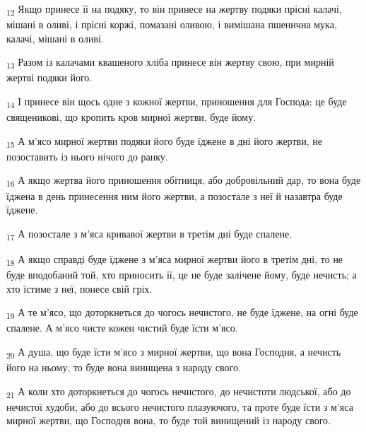 \begin{tcolorbox}
\textsubscript{12} Якщо принесе її на подяку, то він принесе на жертву подяки прісні калачі, мішані в оливі, і прісні коржі, помазані оливою, і вимішана пшенична мука, калачі, мішані в оливі.
\end{tcolorbox}
\begin{tcolorbox}
\textsubscript{13} Разом із калачами квашеного хліба принесе він жертву свою, при мирній жертві подяки його.
\end{tcolorbox}
\begin{tcolorbox}
\textsubscript{14} І принесе він щось одне з кожної жертви, приношення для Господа; це буде священикові, що кропить кров мирної жертви, буде йому.
\end{tcolorbox}
\begin{tcolorbox}
\textsubscript{15} А м'ясо мирної жертви подяки його буде їджене в дні його жертви, не позоставить із нього нічого до ранку.
\end{tcolorbox}
\begin{tcolorbox}
\textsubscript{16} А якщо жертва його приношення обітниця, або добровільний дар, то вона буде їджена в день принесення ним його жертви, а позостале з неї й назавтра буде їджене.
\end{tcolorbox}
\begin{tcolorbox}
\textsubscript{17} А позостале з м'яса кривавої жертви в третім дні буде спалене.
\end{tcolorbox}
\begin{tcolorbox}
\textsubscript{18} А якщо справді буде їджене з м'яса мирної жертви його в третім дні, то не буде вподобаний той, хто приносить її, це не буде залічене йому, буде нечисть; а хто їстиме з неї, понесе свій гріх.
\end{tcolorbox}
\begin{tcolorbox}
\textsubscript{19} А те м'ясо, що доторкнеться до чогось нечистого, не буде їджене, на огні буде спалене. А м'ясо чисте кожен чистий буде їсти м'ясо.
\end{tcolorbox}
\begin{tcolorbox}
\textsubscript{20} А душа, що буде їсти м'ясо з мирної жертви, що вона Господня, а нечисть його на ньому, то буде вона винищена з народу свого.
\end{tcolorbox}
\begin{tcolorbox}
\textsubscript{21} А коли хто доторкнеться до чогось нечистого, до нечистоти людської, або до нечистої худоби, або до всього нечистого плазуючого, та проте буде їсти з м'яса мирної жертви, що Господня вона, то буде той винищений із народу свого.
\end{tcolorbox}
